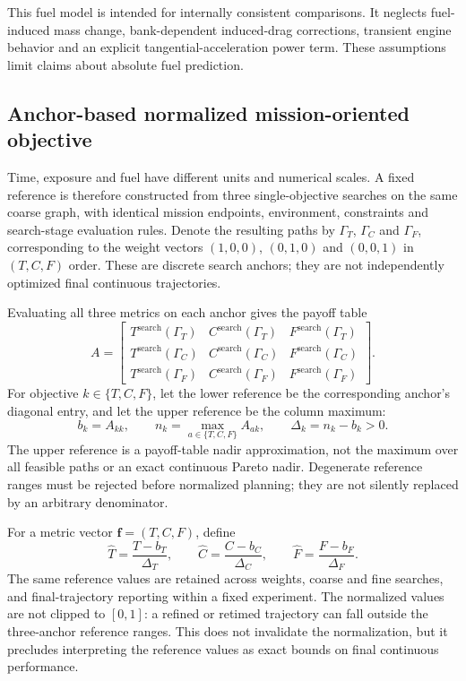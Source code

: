This fuel model is intended for internally consistent comparisons. It
neglects fuel-induced mass change, bank-dependent induced-drag corrections,
transient engine behavior and an explicit tangential-acceleration power
term. These assumptions limit claims about absolute fuel prediction.

\subsection{Anchor-based normalized mission-oriented objective}
\label{pr:sec:objective}
Time, exposure and fuel have different units and numerical scales. A fixed
reference is therefore constructed from three single-objective searches
on the same coarse graph, with identical mission endpoints, environment,
constraints and search-stage evaluation rules. Denote the resulting paths
by $\Gamma_T$, $\Gamma_C$ and $\Gamma_F$, corresponding to the weight
vectors $(1,0,0)$, $(0,1,0)$ and $(0,0,1)$ in $(T,C,F)$ order. These
are discrete search anchors; they are not independently optimized final
continuous trajectories.

Evaluating all three metrics on each anchor gives the payoff table
\begin{equation}
 A=\begin{bmatrix}
 T^{\mathrm{search}}(\Gamma_T)&C^{\mathrm{search}}(\Gamma_T)&F^{\mathrm{search}}(\Gamma_T)\\
 T^{\mathrm{search}}(\Gamma_C)&C^{\mathrm{search}}(\Gamma_C)&F^{\mathrm{search}}(\Gamma_C)\\
 T^{\mathrm{search}}(\Gamma_F)&C^{\mathrm{search}}(\Gamma_F)&F^{\mathrm{search}}(\Gamma_F)
 \end{bmatrix}.
 \label{pr:eq:payoff}
\end{equation}
For objective $k\in\{T,C,F\}$, let the lower reference be the corresponding
anchor's diagonal entry, and let the upper reference be the column maximum:
\begin{equation}
 b_k=A_{kk},\qquad n_k=\max_{a\in\{T,C,F\}}A_{ak},\qquad
 \Delta_k=n_k-b_k>0.
 \label{pr:eq:anchorscale}
\end{equation}
The upper reference is a payoff-table nadir approximation, not the
maximum over all feasible paths or an exact continuous Pareto nadir.
Degenerate reference ranges must be rejected before normalized planning;
they are not silently replaced by an arbitrary denominator.

For a metric vector $\mathbf{f}=(T,C,F)$, define
\begin{equation}
 \widehat T=\frac{T-b_T}{\Delta_T},\qquad
 \widehat C=\frac{C-b_C}{\Delta_C},\qquad
 \widehat F=\frac{F-b_F}{\Delta_F}.
 \label{pr:eq:normalize}
\end{equation}
The same reference values are retained across weights, coarse and fine
searches, and final-trajectory reporting within a fixed experiment.
The normalized values are not clipped to $[0,1]$: a refined or retimed
trajectory can fall outside the three-anchor reference ranges. This does
not invalidate the normalization, but it precludes interpreting the
reference values as exact bounds on final continuous performance.

